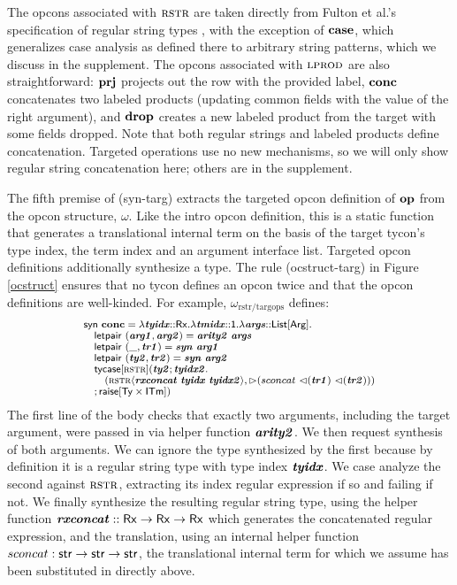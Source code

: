 \documentclass[10pt,preprint]{sigplanconf}
\begin{document}
The opcons associated with $\textsc{rstr}$ are taken directly from Fulton et al.'s specification of regular string types \cite{sanitation-psp14}, with the exception of $\textbf{case}$, which generalizes case analysis as defined there to arbitrary string patterns, which we discuss in the supplement. The opcons associated with $\textsc{lprod}$ are also straightforward: $\textbf{prj}$ projects out the row with the provided label, $\textbf{conc}$ concatenates two labeled products (updating common fields with the value of the right argument), and $\textbf{drop}$ creates a new labeled product from the target with some fields dropped. Note that both regular strings and labeled products define concatenation. Targeted operations use no new mechanisms, so we will only show regular string concatenation here; others are in the supplement.

The fifth premise of (syn-targ) extracts the targeted opcon definition of $\textbf{op}$ from the opcon structure, $\omega$. Like the intro opcon definition, this is a static function that generates a translational internal term on the basis of the target tycon's type index, the term index and an argument interface list. Targeted opcon definitions additionally synthesize a type. The rule (ocstruct-targ) in Figure \ref{ocstruct} ensures that no tycon defines an opcon twice and that the opcon definitions are well-kinded. 
For example, $\omega_\text{rstr/targops}$ defines:
\[\small
\begin{array}{l}
\keyw{syn}~\opname{conc}=\slam{\krx}{\svar{tyidx}}{
    \slam{\kunit}{\svar{tmidx}}{
        \slam{\kargs}{\svar{args}}{\\
            \quad \keyw{letpair}~(\svar{arg1}, \svar{arg2}) = \svar{arity2}~\svar{args}\\
            \quad \keyw{letpair}~(\_, \svar{tr1}) = \svar{syn}~\svar{arg1}\\
            \quad \keyw{letpair}~(\svar{ty2}, \svar{tr2}) = \svar{syn}~\svar{arg2}\\
            \quad \stycase{\tcvar{rstr}}{\svar{ty2}}{\svar{tyidx2}}{\\
                \quad\quad (\sty{\tcvar{rstr}}{\svar{rxconcat}~\svar{tyidx}~\svar{tyidx2}}, \sqitm{sconcat~\quq{\svar{tr1}}~\quq{\svar{tr2}}})\\
                \quad
            }{\sraise{\kty\times\kitm}}
        }
    }
}
\end{array}
\]
The first line of the body checks that exactly two arguments, including the target argument, were passed in via helper function ${\textbf{\textit{arity2}}}$. We then request synthesis of both arguments. We can ignore the type synthesized by the first because by definition it is a regular string type with type index ${\textbf{\textit{tyidx}}}$. We case analyze the second against $\textsc{rstr}$, extracting its index regular expression if so and failing if not. We finally synthesize the resulting regular string type, using the helper function ${\textbf{\textit{rxconcat}}} :: {\sf Rx} \rightarrow {\sf Rx} \rightarrow {\sf Rx}$ which generates the concatenated regular expression, and the translation, using an internal helper function $sconcat : {\sf str} \rightarrow {\sf str} \rightarrow {\sf str}$, the translational internal term for which we assume has been substituted in directly above.
\end{document}
